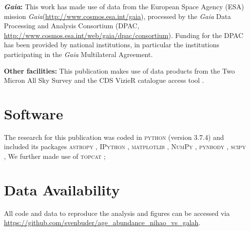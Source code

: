 \documentclass[fleqn,usenatbib]{mnras}
\newcommand{\Gaia}{\textit{Gaia}\xspace} %
\begin{document}
\textbf{\Gaia: } This work has made use of data from the European Space Agency (ESA) mission \Gaia (\url{http://www.cosmos.esa.int/gaia}), processed by the \Gaia Data Processing and Analysis Consortium (DPAC, \url{http://www.cosmos.esa.int/web/gaia/dpac/consortium}). Funding for the DPAC has been provided by national institutions, in particular the institutions participating in the \Gaia Multilateral Agreement. 

\textbf{Other facilities:} This publication makes use of data products from the Two Micron All Sky Survey \citep{Skrutskie2006} and the CDS VizieR catalogue access tool \citep{Vizier2000}.

\section*{Software}

The research for this publication was coded in \textsc{python} (version 3.7.4) and included its packages
\textsc{astropy} \citep[v. 3.2.2;][]{Robitaille2013,PriceWhelan2018},
\textsc{IPython} \citep[v. 7.8.0;][]{ipython},
\textsc{matplotlib} \citep[v. 3.1.3;][]{matplotlib},
\textsc{NumPy} \citep[v. 1.17.2;][]{numpy},
\textsc{pynbody} \citep[v. 1.1.0;][]{pynbody},
\textsc{scipy} \citep[version 1.3.1;][]{scipy},
We further made use of \textsc{topcat} \citep[version 4.7;][]{Taylor2005};

\section*{Data Availability}

All code and data to reproduce the analysis and figures can be accessed via \url{https://github.com/svenbuder/age_abundance_nihao_vs_galah}.

\end{document}
